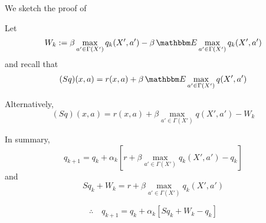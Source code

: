 \documentclass[xcolor=dvipsnames]{beamer}  %
\newcommand{\fore}{\therefore \quad}
\newcommand{\1}{\mathbbm 1}
\newcommand{\EE}{\mathbbm E}
\begin{document}
\begin{frame}

    We sketch the proof of \cite{tsitsiklis1994asynchronous}
    
            \vspace{0.5em}
    Let
    \begin{equation*}
        W_k 
        := \beta \max_{a' \in \Gamma(X')} q_k(X', a') 
        - \beta \, \EE \max_{a' \in \Gamma(X')} q_k(X', a')
    \end{equation*}
    and recall that
    \begin{equation*}
        (S q)(x,a)
        =  r(x, a) + \beta \,\EE \max_{a' \in \Gamma(X')} q(X',a')
    \end{equation*}

            \vspace{0.5em}
            \vspace{0.5em}
    Alternatively,
    \begin{equation*}
        (S q)(x,a)
        =  r(x, a) + \beta \max_{a' \in \Gamma(X')} q(X',a') - W_k
    \end{equation*}

\end{frame}

\begin{frame}

    In summary,
    \begin{equation*}
        q_{k+1} 
        = q_k + \alpha_k 
        \left[
            r + \beta \max_{a' \in \Gamma(X')} q_k(X', a')
            - q_k
        \right]
    \end{equation*}
    and
    \begin{equation*}
          S q_k + W_k
        = r + \beta \max_{a' \in \Gamma(X')} q_k(X', a')
    \end{equation*}

    \begin{equation*}
        \fore
        q_{k+1} 
        = q_k + \alpha_k 
        \left[
            S q_k + W_k - q_k
        \right]
    \end{equation*}

\end{frame}
\end{document}
